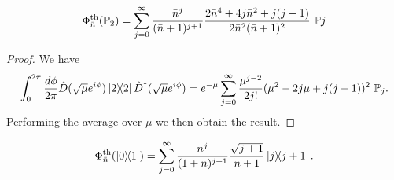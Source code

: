 \documentclass[12pt]{report}
\newcommand{\PP}{\mathbb{P}}
\begin{document}
\begin{prop}
	\begin{equation}
		\Phi_{\bar n}^{\rm th}(\PP_2)
		= \sum_{j=0}^\infty
		\frac{\bar n^j}{(\bar n + 1)^{j+1}}
		\frac{
			2\bar n^4 + 4j \bar n^2 + j(j-1)
		}{2 \bar n^2 (\bar n + 1)^2}
		\,\, \PP j
	\end{equation}
\end{prop}
\begin{proof}
	We have
	\begin{equation}
		\int_0^{2\pi} \frac{d\phi}{2\pi}
		\hat D(\sqrt\mu e^{i\phi})\ketbra2 \hat D^\dagger(\sqrt\mu e^{i\phi})
		= e^{-\mu}
		\sum_{j=0}^\infty \frac{\mu^{j-2}}{2j!}
		(\mu^2 -2j \mu + j(j-1))^2
		\,\,\PP_j.
	\end{equation}
	Performing the average over $\mu$ we then obtain the result.
\end{proof}

\begin{prop}\label{prop:thermalisation_applied_to_01}
	\begin{equation}
		\Phi^{\rm th}_{\bar n}(\ketbra{0}{1})
		= \sum_{j=0}^\infty
		\frac{\bar n^{j}}{(1+\bar n)^{j+1}}
		\frac{\sqrt{j+1}}{\bar n + 1}
		\ketbra{j}{j+1}.
	\end{equation}
\end{prop}
\end{document}
